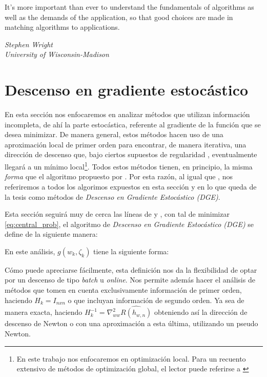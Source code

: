 \documentclass{book}
\makeatletter
\theoremstyle{plain}
\theoremstyle{definition}
\theoremstyle{remark}
\def\BState{\State\hskip-\ALG@thistlm}
\makeatother
\begin{document}
\epigraph{It’s more important than ever to understand the fundamentals of
algorithms as well as the demands of the application, so that good
choices are made in matching algorithms to applications.}{\textit{Stephen Wright \\ University of Wisconsin-Madison}}
\newpage

\section{Descenso en gradiente estocástico}

En esta sección nos enfocaremos en analizar métodos que utilizan información incompleta, de ahí la parte estocástica, referente al gradiente de la función que se desea minimizar. De manera general, estos métodos hacen uso de una aproximación local de primer orden para encontrar, de manera iterativa, una dirección de descenso que, bajo ciertos supuestos de regularidad \cite{NOCEDAL}, eventualmente llegará a un mínimo local\footnote{En este trabajo nos enfocaremos en optimización local. Para un recuento extensivo de métodos de optimización global, el lector puede referirse a \cite{TORN}}. Todos estos métodos tienen, en principio, la misma \emph{forma} que el algoritmo propuesto por \cite{ROBBINS}. Por esta razón, al igual que \cite{BOTTOU}, nos referiremos a todos los algorimos expuestos en esta sección y en lo que queda de la tesis como métodos de \emph{Descenso en Gradiente Estocástico (DGE)}. 

Esta sección seguirá muy de cerca las líneas de \cite{BOTTOU} y , con tal de minimizar \ref{eq:central_prob}, el algoritmo de \emph{Descenso en Gradiente Estocástico (DGE)} se define de la siguiente manera:


En este análisis, $g(w_k, \zeta_k)$ tiene la siguiente forma:

Cómo puede apreciarse fácilmente, esta definición nos da la flexibilidad de optar por un descenso de tipo \emph{batch} u \emph{online}. Nos permite además hacer el análisis de métodos que tomen en cuenta exclusivamente información de primer orden, haciendo $H_k = I_{nxn}$ o que incluyan información de segundo orden. Ya sea de manera exacta, haciendo $H^{-1}_k = \nabla^2_{ww}\hat{R(h_{w,n})}$ obteniendo así la dirección de descenso de Newton o con una aproximación a esta última, utilizando un pseudo Newton.
\end{document}
